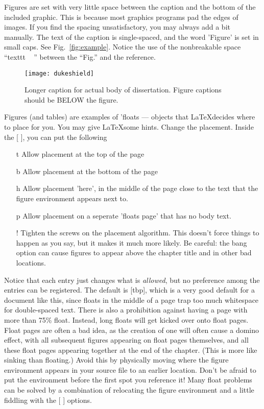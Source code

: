 Figures are set with very little space between the caption and the bottom of
the included graphic.  This is because most graphics programs pad the edges
of images.  If you find the spacing unsatisfactory, you may always add a bit
manually.  The text of the caption is single-spaced, and the word 'Figure'
is set in small caps.  See Fig.~\ref{fig:example}.  Notice the use of the
nonbreakable space ``texttt{ ~ }'' between the ``Fig.'' and the reference.
\begin{figure}[tbp]
\begin{center}
\texttt{[image: dukeshield]}
\end{center}
\caption{Longer caption for actual body
of dissertation.  Figure captions should be BELOW the figure.}
\end{figure}
Figures (and tables) are examples of 'floats --- objects that \LaTeX decides
where to place for you.  You may give \LaTeX some hints.  Change the 
placement.  Inside the [ ], you can put the following
\begin{itemize}
\item[t] Allow placement at the top of the page
\item[b] Allow placement at the bottom of the page
\item[h] Allow placement 'here', in the middle of the page close to the text
that the figure environment appears next to.
\item[p] Allow placement on a seperate 'floats page' that has no body text.
\item[!] Tighten the screws on the placement algorithm.  This doesn't force
	things to happen as you say, but it makes it much more likely.  
	Be careful: the bang option can cause figures
   to appear above the chapter title and in other bad locations.
\end{itemize}
Notice that each entry just changes what is \emph{allowed}, 
but no preference among
the entries can be registered.  The default is [tbp], which is a very good
default for a document like this, since floats in the middle of a page trap
too much whitespace for double-spaced text. There is also a prohibition against
having a page with more than 75\% float.  Instead, long floats will
get kicked over onto float pages.  Float pages are often a bad idea, as the
creation of one will often cause a domino effect, with all subsequent
figures appearing on float pages themselves, and all these float pages
appearing together at the end of the chapter.  (This is more like sinking
than floating.)  Avoid this by physically moving where the figure environment
appears in your source file to an earlier location.  Don't be afraid to put the environment before
the first spot you reference it!  Many float problems can be solved by a
combination of relocating the figure environment and a little fiddling with the [ ] options.

